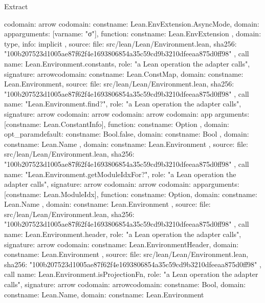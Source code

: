\begin{lexlean}{Extract}
\begin{toolingmodule}
{{{        codomain: arrow{
          codomain: const{name: Lean.EnvExtension.AsyncMode},
          domain: app{arguments: [var{name: "σ"}], function: const{name: Lean.EnvExtension}}
        },
        domain: type{},
        info: implicit
      },
      source: {
        file: src/lean/Lean/Environment.lean,
        sha256: "100b207523d1005ae87f62f4e1693806854a35c59cd9b3210dfeeaa875d0ff98"
      }
    },
    call{
      name: Lean.Environment.constants,
      role: "a Lean operation the adapter calls",
      signature: arrow{codomain: const{name: Lean.ConstMap}, domain: const{name: Lean.Environment}},
      source: {
        file: src/lean/Lean/Environment.lean,
        sha256: "100b207523d1005ae87f62f4e1693806854a35c59cd9b3210dfeeaa875d0ff98"
      }
    },
    call{
      name: "Lean.Environment.find?",
      role: "a Lean operation the adapter calls",
      signature: arrow{
        codomain: arrow{
          codomain: arrow{
            codomain: app{
              arguments: [const{name: Lean.ConstantInfo}],
              function: const{name: Option}
            },
            domain: opt_param{default: const{name: Bool.false}, domain: const{name: Bool}}
          },
          domain: const{name: Lean.Name}
        },
        domain: const{name: Lean.Environment}
      },
      source: {
        file: src/lean/Lean/Environment.lean,
        sha256: "100b207523d1005ae87f62f4e1693806854a35c59cd9b3210dfeeaa875d0ff98"
      }
    },
    call{
      name: "Lean.Environment.getModuleIdxFor?",
      role: "a Lean operation the adapter calls",
      signature: arrow{
        codomain: arrow{
          codomain: app{arguments: [const{name: Lean.ModuleIdx}], function: const{name: Option}},
          domain: const{name: Lean.Name}
        },
        domain: const{name: Lean.Environment}
      },
      source: {
        file: src/lean/Lean/Environment.lean,
        sha256: "100b207523d1005ae87f62f4e1693806854a35c59cd9b3210dfeeaa875d0ff98"
      }
    },
    call{
      name: Lean.Environment.header,
      role: "a Lean operation the adapter calls",
      signature: arrow{
        codomain: const{name: Lean.EnvironmentHeader},
        domain: const{name: Lean.Environment}
      },
      source: {
        file: src/lean/Lean/Environment.lean,
        sha256: "100b207523d1005ae87f62f4e1693806854a35c59cd9b3210dfeeaa875d0ff98"
      }
    },
    call{
      name: Lean.Environment.isProjectionFn,
      role: "a Lean operation the adapter calls",
      signature: arrow{
        codomain: arrow{codomain: const{name: Bool}, domain: const{name: Lean.Name}},
        domain: const{name: Lean.Environment}
}}}
\end{toolingmodule}
\end{lexlean}
